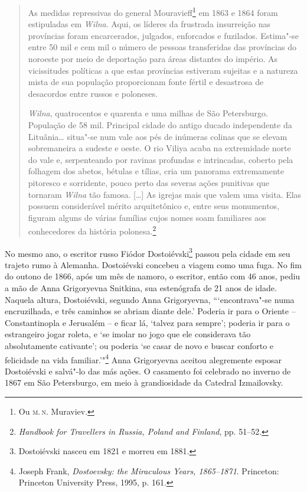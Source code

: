 \begin{quote}
As medidas repressivas do general Mouravieff\footnote{Ou \textsc{m.\,n.} Muraviev.} em 1863 e
1864 foram estipuladas em \textit{Wilna}. Aqui, os líderes da frustrada
insurreição nas províncias foram encarcerados, julgados, enforcados e
fuzilados. Estima"-se entre 50 mil e cem mil o número de pessoas
transferidas das províncias do noroeste por meio de deportação para
áreas distantes do império. As vicissitudes políticas a que estas
províncias estiveram sujeitas e a natureza mista de sua população
proporcionam fonte fértil e desastrosa de desacordos entre russos e
poloneses.

\textit{Wilna}, quatrocentos e quarenta e uma milhas de São Petersburgo. População de 58 mil. Principal cidade do antigo
ducado independente da Lituânia\ldots{} situa"-se num vale aos pés de
inúmeras colinas que se elevam sobremaneira a sudeste e oeste. O rio
Viliya acaba na extremidade norte do vale e, serpenteando por ravinas
profundas e intrincadas, coberto pela folhagem dos abetos, bétulas e
tílias, cria um panorama extremamente pitoresco e sorridente, pouco
perto das severas ações punitivas que tornaram \textit{Wilna} tão famosa.
[\ldots{}] As igrejas mais que valem uma visita. Elas possuem considerável
mérito arquitetônico e, entre seus monumentos, figuram alguns de várias
famílias cujos nomes soam familiares aos conhecedores da história
polonesa.\footnote{\textit{Handbook for Travellers in Russia, Poland and Finland}, pp. 51--52.} 
\end{quote}

No mesmo ano, o escritor russo Fiódor Dostoiévski\footnote{Dostoiévski nasceu em 1821 e morreu em 1881.} passou
pela cidade em seu trajeto rumo à Alemanha. Dostoiévski concebeu a
viagem como uma fuga. No fim do outono de 1866, após um mês de namoro, o
escritor, então com 46 anos, pediu a mão de Anna Grigoryevna Snitkina,
sua estenógrafa de 21 anos de idade. Naquela altura, Dostoiévski,
segundo Anna Grigoryevna, ```encontrava"-se numa encruzilhada, e três
caminhos se abriam diante dele.' Poderia ir para o Oriente --
Constantinopla e Jerusalém -- e ficar lá, `talvez para sempre'; poderia
ir para o estrangeiro jogar roleta, e `se imolar no jogo que ele
considerava tão absolutamente cativante'; ou poderia `se casar de novo e
buscar conforto e felicidade na vida familiar.'"\footnote{Joseph Frank, \textit{Dostoevsky: the Miraculous Years, 1865--1871}. Princeton: Princeton University Press, 1995, p. 161.} Anna Grigoryevna aceitou alegremente esposar Dostoiévski e salvá"-lo das más ações. O casamento
foi celebrado no inverno de 1867 em São Petersburgo, em meio à
grandiosidade da Catedral Izmailovsky.

